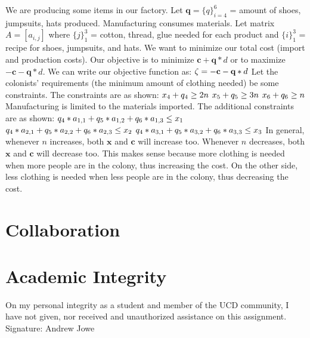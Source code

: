\documentclass{article}
\begin{document}
\begin{enumerate}
        \newline We are producing some items in our factory. Let $\textbf{q} = \{q\}_{i=4}^6$ = amount of shoes, jumpsuits, hats produced.
        \newline Manufacturing consumes materials. Let matrix $A = [a_{i,j}]$ where $\{j\}_1^3$ = cotton, thread, glue needed for each product and $\{i\}_1^3$ = recipe for shoes, jumpsuits, and hats.
        \newline We want to minimize our total cost (import and production costs). Our objective is to minimize $\textbf{c}+\textbf{q}*d$ or to maximize $-\textbf{c}-\textbf{q}*d$. We can write our objective function as:
        $\\\zeta = -\textbf{c}-\textbf{q}*d$
        \newline Let the colonists' requirements (the minimum amount of clothing needed) be some constraints. The constraints are as shown:
        $\\x_4 + q_4 \geq 2n$
        $\\x_5 + q_5 \geq 3n$
        $\\x_6 + q_6 \geq n$
        \newline Manufacturing is limited to the materials imported. The additional constraints are as shown:
        $\\q_4*a_{1,1} + q_5*a_{1,2} + q_6*a_{1,3} \leq x_1$
        $\\q_4*a_{2,1} + q_5*a_{2,2} + q_6*a_{2,3} \leq x_2$
        $\\q_4*a_{3,1} + q_5*a_{3,2} + q_6*a_{3,3} \leq x_3$
        \newline In general, whenever $n$ increases, both $\textbf{x}$ and $\textbf{c}$ will increase too. Whenever $n$ decreases, both $\textbf{x}$ and $\textbf{c}$ will decrease too. This makes sense because more clothing is needed when more people are in the colony, thus increasing the cost. On the other side, less clothing is needed when less people are in the colony, thus decreasing the cost.
\end{enumerate}

\newpage
\section{Collaboration}

\newpage
\section{Academic Integrity}
On my personal integrity as a student and member of the UCD community, I have not given, nor received and unauthorized assistance on this assignment.
\newline Signature: Andrew Jowe
\end{document}
